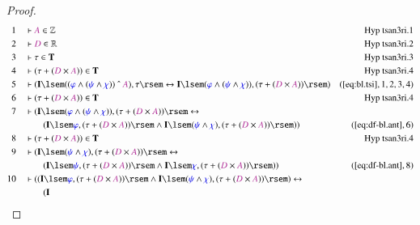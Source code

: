 \begin{proof}
\begin{align}
  1 &&  & \vdash \mc{A} \in \mathbb{Z}&\text{Hyp~tsan3ri.1}\notag%
  \\ 2 &&  & \vdash \mc{D} \in
      \mathbb{R}&\text{Hyp~tsan3ri.2}\notag%
  \\ 3 &&  & \vdash \tau \in \mathbf{T}&\text{Hyp~tsan3ri.3}\notag%
  \\ 4 &&  & \vdash ( \tau + ( \mc{D} \times \mc{A} ) ) \in
      \mathbf{T}&\text{Hyp~tsan3ri.4}\notag%
  \\ 5 &&  & \vdash ( \mathbf{I} \lsem ( ( \mw{\varphi} \wedge ( \mw{\psi}
      \wedge \mw{\chi} ) ) ~\string^~ \mc{A} ) , \tau \rsem
      \leftrightarrow \mathbf{I} \lsem ( \mw{\varphi}
      \wedge ( \mw{\psi} \wedge \mw{\chi} ) ) , ( \tau + (
      \mc{D} \times \mc{A} ) ) \rsem
      )&(\mbox{\ref{eq:bl.tsi}},1,2,3,4)\notag
  \\ 6 &&  & \vdash ( \tau + ( \mc{D} \times \mc{A} ) ) \in
      \mathbf{T}&\text{Hyp~tsan3ri.4}\notag%
  \\ 7 &&  & \vdash ( \mathbf{I} \lsem ( \mw{\varphi} \wedge ( \mw{\psi} \wedge
      \mw{\chi} ) ) , ( \tau + ( \mc{D} \times \mc{A} ) )
      \rsem \leftrightarrow  \notag \\ & & & \qquad
     ( \mathbf{I} \lsem \mw{\varphi}
      , ( \tau + ( \mc{D} \times \mc{A} ) ) \rsem \wedge
      \mathbf{I} \lsem ( \mw{\psi} \wedge \mw{\chi} ) , (
      \tau + ( \mc{D} \times \mc{A} ) ) \rsem )
      )&(\mbox{\ref{eq:df-bl.ant}},6)\notag
  \\ 8 &&  & \vdash ( \tau + ( \mc{D} \times \mc{A} ) ) \in
      \mathbf{T}&\text{Hyp~tsan3ri.4}\notag%
  \\ 9 &&  & \vdash ( \mathbf{I} \lsem ( \mw{\psi} \wedge \mw{\chi} ) , ( \tau
      + ( \mc{D} \times \mc{A} ) ) \rsem \leftrightarrow \notag \\ & & & \qquad
      (
      \mathbf{I} \lsem \mw{\psi} , ( \tau + ( \mc{D} \times
      \mc{A} ) ) \rsem \wedge \mathbf{I} \lsem \mw{\chi} ,
      ( \tau + ( \mc{D} \times \mc{A} ) ) \rsem )
      )&(\mbox{\ref{eq:df-bl.ant}},8)\notag
  \\ 10 &&  & \vdash ( ( \mathbf{I} \lsem \mw{\varphi} , ( \tau + ( \mc{D}
      \times \mc{A} ) ) \rsem \wedge \mathbf{I} \lsem (
      \mw{\psi} \wedge \mw{\chi} ) , ( \tau + ( \mc{D}
      \times \mc{A} ) ) \rsem ) \leftrightarrow \notag \\ & & & \qquad
      ( \mathbf{I}

\end{align}
\end{proof}
